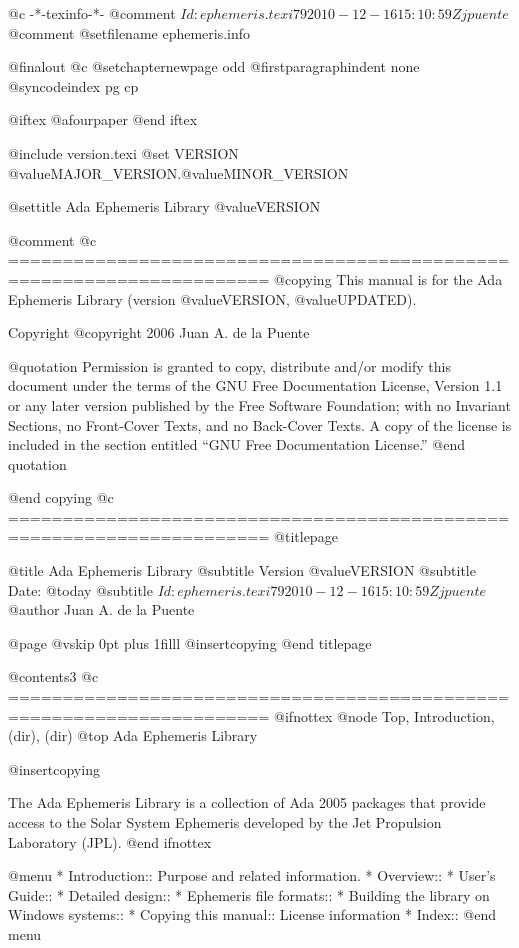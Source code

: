    @c -*-texinfo-*-
@comment $Id: ephemeris.texi 79 2010-12-16 15:10:59Z jpuente $
@comment %
@setfilename ephemeris.info

@finalout
@c @setchapternewpage odd
@firstparagraphindent none
@syncodeindex pg cp

@iftex
@afourpaper
@end iftex

@include version.texi
@set VERSION @value{MAJOR_VERSION}.@value{MINOR_VERSION}

@settitle Ada Ephemeris Library @value{VERSION}

@comment %
@c ======================================================================
@copying
This manual is for the Ada Ephemeris Library (version @value{VERSION},
@value{UPDATED}).

Copyright @copyright{} 2006 Juan A. de la Puente

@quotation
Permission is granted to copy, distribute and/or modify this document
under the terms of the GNU Free Documentation License, Version 1.1 or
any later version published by the Free Software Foundation; with no
Invariant Sections, no Front-Cover Texts, and no Back-Cover Texts.  A
copy of the license is included in the section entitled ``GNU Free
Documentation License.''
@end quotation

@end copying
@c ======================================================================
@titlepage

@title Ada Ephemeris Library
@subtitle Version @value{VERSION}
@subtitle Date: @today{}
@subtitle $Id: ephemeris.texi 79 2010-12-16 15:10:59Z jpuente $
@author Juan A. de la Puente

@page
@vskip 0pt plus 1filll
@insertcopying
@end titlepage

@contents3
@c ======================================================================
@ifnottex
@node Top, Introduction, (dir), (dir)
@top Ada Ephemeris Library

@insertcopying

The Ada Ephemeris Library is a collection of Ada 2005 packages that
provide access to the Solar System Ephemeris developed by the
Jet Propulsion Laboratory (JPL).
@end ifnottex

@menu
* Introduction::                Purpose and related information.
* Overview::                    
* User's Guide::                
* Detailed design::             
* Ephemeris file formats::      
* Building the library on Windows systems::  
* Copying this manual::         License information
* Index::                       
@end menu

